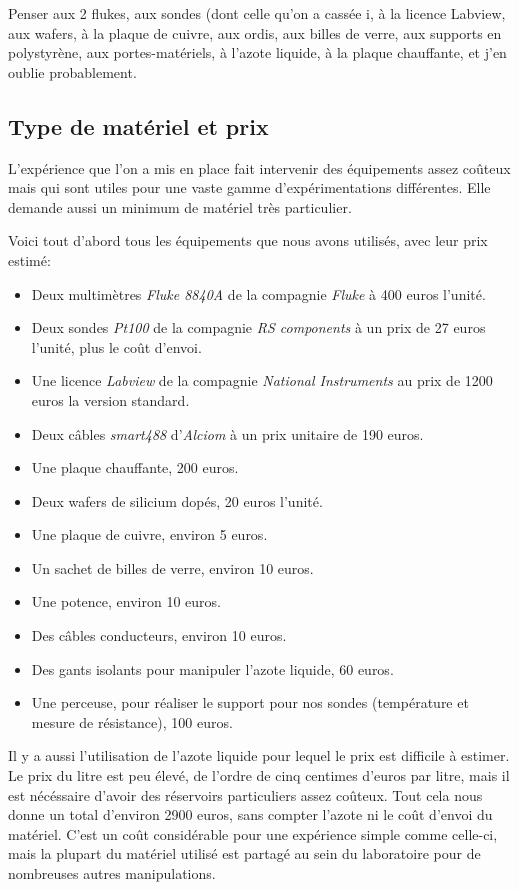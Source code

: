 Penser aux 2 flukes, aux sondes (dont celle qu'on a cassée ^^),
à la licence Labview, aux wafers, à la plaque de cuivre, aux ordis, 
aux billes de verre, aux supports en polystyrène, aux portes-matériels, 
à l'azote liquide, à la plaque chauffante, et j'en oublie probablement.

\subsection{Type de matériel et prix}
L'expérience que l'on a mis en place fait intervenir des équipements assez coûteux mais qui sont utiles pour une vaste gamme d'expérimentations différentes. Elle demande aussi un minimum de matériel très particulier.

\bigskip
Voici tout d'abord tous les équipements que nous avons utilisés, avec leur prix estimé:

\begin{itemize}
  \item Deux multimètres \emph{Fluke 8840A} de la compagnie \emph{Fluke} à 400 euros l'unité.
  \item Deux sondes \emph{Pt100} de la compagnie \emph{RS components} à un prix de 27 euros l'unité, plus le coût d'envoi.
  \item Une licence \emph{Labview} de la compagnie \emph{National Instruments} au prix de 1200 euros la version standard.
  \item Deux câbles \emph{smart488} d'\emph{Alciom} à un prix unitaire de 190 euros.
  \item Une plaque chauffante, 200 euros.
  \item Deux wafers de silicium dopés, 20 euros l'unité.
  \item Une plaque de cuivre, environ 5 euros.
  \item Un sachet de billes de verre, environ 10 euros.
  \item Une potence, environ 10 euros. 
  \item Des câbles conducteurs, environ 10 euros.
  \item Des gants isolants pour manipuler l'azote liquide, 60 euros.
  \item Une perceuse, pour réaliser le support pour nos sondes (température et mesure de résistance), 100 euros.
\end{itemize}

\bigskip
Il y a aussi l'utilisation de l'azote liquide pour lequel le prix est difficile à estimer. Le prix du litre est peu élevé, de l'ordre de cinq centimes d'euros par litre, mais il est nécéssaire d'avoir des réservoirs particuliers assez coûteux.
Tout cela nous donne un total d'environ 2900 euros, sans compter l'azote ni le coût d'envoi du matériel.
C'est un coût considérable pour une expérience simple comme celle-ci, mais la plupart du matériel utilisé est partagé au sein du laboratoire pour de nombreuses autres manipulations.


